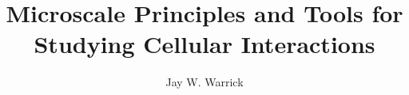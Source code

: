 \documentclass[11pt]{report}
\begin{document}
\title{Microscale Principles and Tools for Studying Cellular Interactions}
\author{Jay W. Warrick}



\beforepreface
{}
 
 

\listoffigures
\listoftables

\afterpreface













\appendix       %









\begin{singlespacing}

\end{singlespacing}
\end{document}
